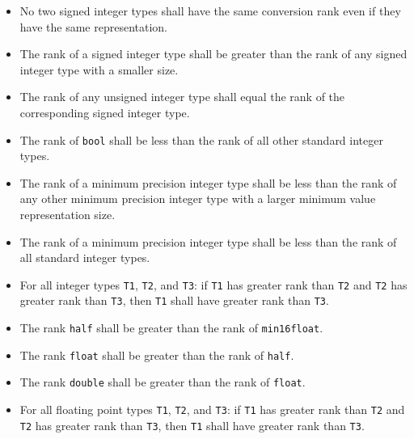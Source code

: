 
\begin{itemize}
  \item  No two signed integer types shall have the same conversion rank even if
  they have the same representation.
  \item The rank of a signed integer type shall be greater than the rank of any
  signed integer type with a smaller size.
  \item The rank of any unsigned integer type shall equal the rank of the
  corresponding signed integer type.
  \item The rank of \texttt{bool} shall be less than the rank of all other
  standard integer types.
  \item The rank of a minimum precision integer type shall be less than the rank
  of any other minimum precision integer type with a larger minimum value
  representation size.
  \item The rank of a minimum precision integer type shall be less than the rank
  of all standard integer types.
  \item For all integer types \texttt{T1}, \texttt{T2}, and \texttt{T3}: if
  \texttt{T1} has greater rank than \texttt{T2} and \texttt{T2} has greater rank
  than \texttt{T3}, then \texttt{T1} shall have greater rank than \texttt{T3}.
\end{itemize}


\begin{itemize}
  \item The rank \texttt{half} shall be greater than the rank of \texttt{min16float}.
  \item The rank \texttt{float} shall be greater than the rank of \texttt{half}.
  \item The rank \texttt{double} shall be greater than the rank of \texttt{float}.
  \item For all floating point types \texttt{T1}, \texttt{T2}, and \texttt{T3}:
  if \texttt{T1} has greater rank than \texttt{T2} and \texttt{T2} has greater
  rank than \texttt{T3}, then \texttt{T1} shall have greater rank than
  \texttt{T3}.
\end{itemize}
